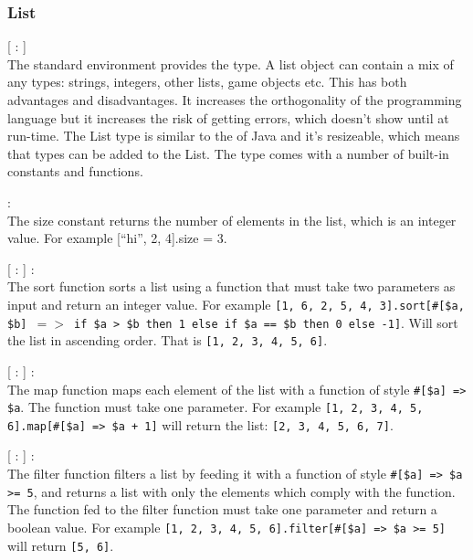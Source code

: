\subsubsection{List}

\begin{dlist}
  \item {}[ : ]\\
    The standard environment provides the  type. A list object can contain a mix of any types: strings, integers, other lists, game objects etc.
  This has both advantages and disadvantages. It increases the orthogonality of the programming language but it increases the risk of getting
  errors, which doesn't show until at run-time. The List type is similar to the  of Java and it's resizeable, which means that types can be added to the List. The type comes with a number of built-in constants and functions. 
  \item {} : \\
  The size constant returns the number of elements in the list, which is an integer value. For example [``hi'', 2, 4].size = 3.
  \item {}[ : ] :  \\
    The sort function sorts a list using a function that must take two parameters as input and return an integer value. For example \texttt{[1, 6, 2, 5, 4, 3].sort[\#[\$a, \$b] $=>$ if \$a > \$b then 1 else if \$a == \$b then 0 else -1]}. Will sort the list in ascending order. That is \texttt{[1, 2, 3, 4, 5, 6]}.
  \item {}[ : ] :  \\
    The map function maps each element of the list with a function of style \texttt{\#[\$a] => \$a}. The function must take one parameter. For example \texttt{[1, 2, 3, 4, 5, 6].map[\#[\$a] => \$a + 1]} will return the list: \texttt{[2, 3, 4, 5, 6, 7]}.
  \item {}[ : ] :  \\
    The filter function filters a list by feeding it with a function of style \texttt{\#[\$a] => \$a >= 5}, and returns a list with only the elements which comply with the function. The function fed to the filter function must take one parameter and return a boolean value. For example \texttt{[1, 2, 3, 4, 5, 6].filter[\#[\$a] => \$a >= 5]} will return \texttt{[5, 6]}. 
\end{dlist}

